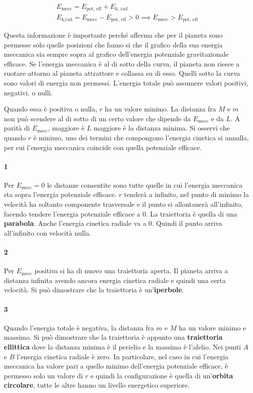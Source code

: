\begin{gather*}
	E_\text{mecc}=E_\text{pot, eff}+E_\text{k, rad} \\
	E_\text{k,rad}=E_\text{mecc}-E_\text{pot, eff} >0 \implies E_\text{mecc}>E_\text{pot, eff}
\end{gather*}

Questa informazione è importante perché afferma che per il pianeta sono permesse solo quelle posizioni che fanno si che il grafico della sua energia meccanica sia sempre sopra al grafico dell'energia potenziale gravitazionale efficace. Se l'energia meccanica è al di sotto della curva, il pianeta non riesce a ruotare attorno al pianeta attrattore e collassa su di esso. Quelli sotto la curva sono valori di energia non permessi. L'energia totale può assumere valori positivi, negativi, o nulli.

Quando essa è positiva o nulla, $r$ ha un valore minimo. La distanza fra $M$ e $m$ non può scendere al di sotto di un certo valore che dipende da $E_\text{mecc}$ e da $L$. A parità di $E_\text{mecc}$, maggiore è $L$ maggiore è la distanza minima. Si osservi che quando $r$ è minimo, uno dei termini che compongono l'energia cinetica si annulla, per cui l'energia meccanica coincide con quella potenziale efficace.

\paragraph{1} Per $E_\text{mecc}=0$ le distanze consentite sono tutte quelle in cui l'energia meccanica sta sopra l'energia potenziale efficace. $r$ tenderà a infinito, nel punto di minimo la velocità ha soltanto componente trasversale e il punto si allontanerà all'infinito, facendo tendere l'energia potenziale efficace a $0$. La traiettoria è quella di una \textbf{parabola}. Anche l'energia cinetica radiale va a $0$. Quindi il punto arriva all'infinito con velocità nulla.

\paragraph{2} Per $E_\text{mecc}$ positiva si ha di nuovo una traiettoria aperta. Il pianeta arriva a distanza infinita avendo ancora energia cinetica radiale e quindi una certa velocità. Si può dimostrare che la traiettoria è un'\textbf{iperbole}.

\paragraph{3} Quando l'energia totale è negativa, la distanza fra $m$ e $M$ ha un valore minimo e massimo. Si può dimostrare che la traiettoria è appunto una \textbf{traiettoria ellittica} dove la distanza minima è il perielio e la massima è l'afelio. Nei punti $A$ e $B$ l'energia cinetica radiale è zero. In particolare, nel caso in cui l'energia meccanica ha valore pari a quello minimo dell'energia potenziale efficace, è permesso solo un valore di $r$ e quindi la configurazione è quella di un'\textbf{orbita circolare}, tutte le altre hanno un livello energetico superiore.

